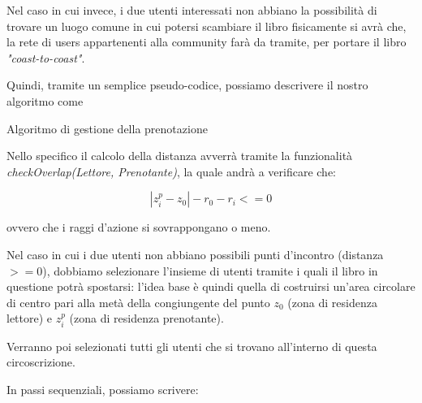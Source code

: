 \begin{itemize}
\begin{itemize}
		Nel caso in cui invece, i due utenti interessati non abbiano la possibilità di trovare un luogo comune in cui potersi scambiare il libro fisicamente si avrà che, la rete di users appartenenti alla community farà da tramite, per portare il libro \textit{"coast-to-coast"}.
		
		Quindi, tramite un semplice pseudo-codice, possiamo descrivere il nostro algoritmo come
	
		\begin{algorithm}[H]
			\SetAlgoLined
			\caption{Algoritmo di gestione della prenotazione}
		\end{algorithm}
		
		
		Nello specifico il calcolo della distanza avverrà tramite la funzionalità \textit{checkOverlap(Lettore, Prenotante)}, la quale andrà a verificare che:
		
		{\LARGE \begin{equation}
			|z^{p}_{i}-z_{0}|-r_{0}-r_{i}<=0
		\end{equation}}
		
		ovvero che i raggi d'azione si sovrappongano o meno.
		
		Nel caso in cui i due utenti non abbiano possibili punti d'incontro (distanza $>= 0 $), dobbiamo selezionare l'insieme di utenti tramite i quali il libro in questione potrà spostarsi: l'idea base è quindi quella di costruirsi un'area circolare di centro pari alla metà della congiungente del punto $ z_{0} $ (zona di residenza lettore) e $ z^{p}_{i} $ (zona di residenza prenotante).
		
		Verranno poi selezionati tutti gli utenti che si trovano all'interno di questa circoscrizione.
		
		In passi sequenziali, possiamo scrivere:
		
		\begin{algorithm}[H]
			\SetAlgoLined
			

\end{algorithm}
\end{itemize}
\end{itemize}
